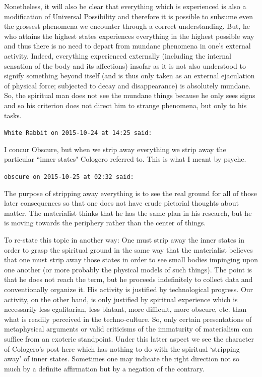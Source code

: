 \begin{footnotesize}
\begin{sffamily}
Nonetheless, it will also be clear that everything which is experienced is also a modification of Universal Possibility and therefore it is possible to subsume even the grossest phenomena we encounter through a correct understanding. But, he who attains the highest states experiences everything in the highest possible way and thus there is no need to depart from mundane phenomena in one's external activity. Indeed, everything experienced externally (including the internal sensation of the body and its affections) insofar as it is not also understood to signify something beyond itself (and is thus only taken as an external ejaculation of physical force; subjected to decay and disappearance) is absolutely mundane. So, the spiritual man does not see the mundane things because he only sees signs and so his criterion does not direct him to strange phenomena, but only to his tasks.


\hfill

\texttt{White Rabbit on 2015-10-24 at 14:25 said: }

I concur Obscure, but when we strip away everything we strip away the particular ``inner states" Cologero referred to. This is what I meant by psyche.


\hfill

\texttt{obscure on 2015-10-25 at 02:32 said: }

The purpose of stripping away everything is to see the real ground for all of those later consequences so that one does not have crude pictorial thoughts about matter. The materialist thinks that he has the same plan in his research, but he is moving towards the periphery rather than the center of things. 

To re-state this topic in another way: One must strip away the inner states in order to grasp the spiritual ground in the same way that the materialist believes that one must strip away those states in order to see small bodies impinging upon one another (or more probably the physical models of such things). The point is that he does not reach the term, but he proceeds indefinitely to collect data and conventionally organize it. His activity is justified by technological progress. Our activity, on the other hand, is only justified by spiritual experience which is necessarily less egalitarian, less blatant, more difficult, more obscure, etc. than what is readily perceived in the techno-culture. So, only certain presentations of metaphysical arguments or valid criticisms of the immaturity of materialism can suffice from an exoteric standpoint. Under this latter aspect we see the character of Cologero's post here which has nothing to do with the spiritual `stripping away' of inner states. Sometimes one may indicate the right direction not so much by a definite affirmation but by a negation of the contrary.



\end{sffamily}
\end{footnotesize}
